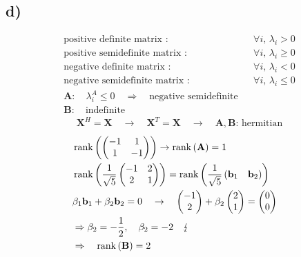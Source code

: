\subsection*{d)}
\qquad{}
\begin{align*}
	&\text{positive definite matrix :}& &\text{$\forall i$, $\lambda_{i}>0$}& \\
	&\text{positive semidefinite matrix :}& &\text{$\forall i$, $\lambda_{i}\ge 0$}& \\
	&\text{negative definite matrix :}& &\text{$\forall i$, $\lambda_{i}<0$}& \\
	&\text{negative semidefinite matrix :}& &\text{$\forall i$, $\lambda_{i}\le 0$}& \\
	&\mathbf{A}:\quad\lambda_{i}^{A}\le 0\quad\Rightarrow\quad\text{negative semidefinite}& \\
	&\mathbf{B}:\quad\text{indefinite}&
\end{align*}
\qquad{}
\begin{align*}
	\mathbf{X}^{H}=\mathbf{X}\quad\rightarrow\quad\mathbf{X}^{T}=\mathbf{X}\quad\rightarrow\quad\mathbf{A, B}\text{: hermitian}
\end{align*}
\qquad{}
\begin{align*}
	&\operatorname{rank}\left(
	\begin{pmatrix}
	-1 & 1 \\
	1 & -1
	\end{pmatrix}
	\right)\rightarrow\operatorname{rank}\left(\mathbf{A}\right)=1& \\
	&\operatorname{rank}\left(\frac{1}{\sqrt{5}}
	\begin{pmatrix}
	-1 & 2 \\
	2 & 1
	\end{pmatrix}
	\right)=
	\operatorname{rank}\left(\frac{1}{\sqrt{5}}\left(\mathbf{b}_{1}\quad\mathbf{b}_{2}\right)\right)& \\
	&\beta_{1}\mathbf{b}_{1}+\beta_{2}\mathbf{b}_{2}=0\quad\rightarrow\quad
	\begin{pmatrix}-1\\2\end{pmatrix}+\beta_{2}\begin{pmatrix}2\\1\end{pmatrix}=\begin{pmatrix}0\\0\end{pmatrix}& \\
	&\Rightarrow\beta_{2}=-\frac{1}{2},\quad\beta_{2}=-2\quad\lightning& \\
	&\Rightarrow\quad\operatorname{rank}\left(\mathbf{B}\right)=2&
\end{align*}
